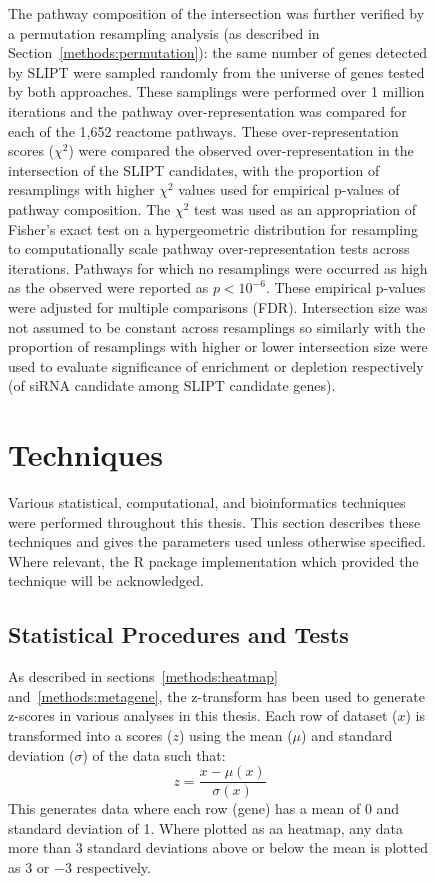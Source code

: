 \begin{figure}[!htp]
The pathway composition of the intersection was further verified by a permutation resampling analysis (as described in Section~\ref{methods:permutation}): the same number of genes detected by SLIPT were sampled randomly from the universe of genes tested by both approaches. These samplings were performed over 1 million iterations and the pathway over-representation was compared for each of the 1,652 reactome pathways.
These over-representation scores ($\chi^2$) were compared the observed over-representation in the intersection of the SLIPT candidates, with the proportion of resamplings with higher $\chi^2$ values used for empirical p-values of pathway composition. The $\chi^2$ test was used as an appropriation of Fisher's exact test on a hypergeometric distribution for resampling to computationally scale pathway over-representation tests across iterations.  Pathways for which no resamplings were occurred as high as the observed were reported as $p < 10^{-6}$. These empirical p-values were adjusted for multiple comparisons (FDR). Intersection size was not assumed to be constant across resamplings so similarly with the proportion of resamplings with higher or lower intersection size were used to evaluate significance of enrichment or depletion respectively (of siRNA candidate among SLIPT candidate genes).  

\section{Techniques}
Various statistical, computational, and bioinformatics techniques were performed throughout this thesis. This section describes these techniques and gives the parameters used unless otherwise specified. Where relevant, the R package implementation which provided the technique will be acknowledged. 

\subsection{Statistical Procedures and Tests}

As described in sections~\ref{methods:heatmap} and~\ref{methods:metagene}, the z-transform has been used to generate z-scores in various analyses in this thesis. Each row of dataset ($x$) is transformed into a scores ($z$) using the mean ($\mu$) and standard deviation ($\sigma$) of the data such that: $$ z = \frac{x - \mu(x)}{\sigma(x)} $$
This generates data where each row (gene) has a mean of 0 and standard deviation of 1. Where plotted as aa heatmap, any data more than 3 standard deviations above or below the mean is plotted as $3$ or $-3$ respectively.


\end{figure}
